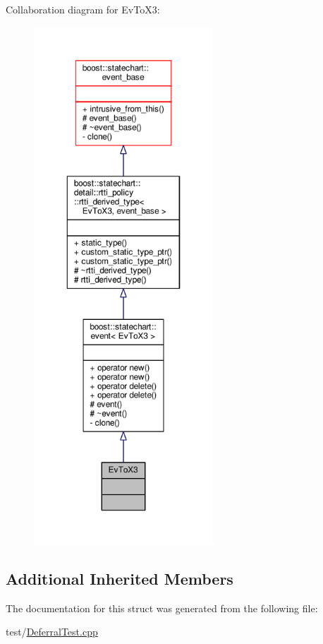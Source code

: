 Collaboration diagram for Ev\+To\+X3\+:
\nopagebreak
\begin{figure}[H]
\begin{center}
\leavevmode
\includegraphics[height=550pt]{struct_ev_to_x3__coll__graph}
\end{center}
\end{figure}
\subsection*{Additional Inherited Members}


The documentation for this struct was generated from the following file\+:\begin{DoxyCompactItemize}
\item 
test/\mbox{\hyperlink{_deferral_test_8cpp}{Deferral\+Test.\+cpp}}\end{DoxyCompactItemize}
